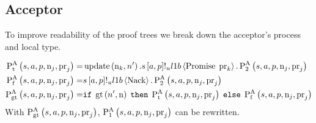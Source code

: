 \subsection{Acceptor}
To improve readability of the proof trees we break down the acceptor's process and local type.

\begin{align*}
\operatorname{P^{A}_{t}}\left(
    s,
    a,
    p,
    \operatorname{n}_{j},
    \operatorname{pr}_{j}
\right) =
& \operatorname{update} \left(\operatorname{n}_{k}, n'\right).s\left[a, p\right]!_u l1b \left\langle \operatorname{Promise}\; \operatorname{pr}_{k} \right\rangle.\operatorname{P^{A}_{2}}\left(
    s,
    a,
    p,
    \operatorname{n}_{j},
    \operatorname{pr}_{j}
\right)
\\
\operatorname{P^{A}_{f}}\left(
    s,
    a,
    p,
    \operatorname{n}_{j},
    \operatorname{pr}_{j}
\right) =
&
    s\left[a, p\right]!_u l1b \left\langle \operatorname{Nack} \right\rangle.
    \operatorname{P^{A}_{2}}\left(
        s,
        a,
        p,
        \operatorname{n}_{j},
        \operatorname{pr}_{j}
    \right)
    \\
\operatorname{P^{A}_{gt}}\left(
    s,
    a,
    p,
    \operatorname{n}_{j},
    \operatorname{pr}_{j}
\right) =
&
    \mathtt{if}\; \operatorname{gt}\left(n', \operatorname{n}\right)
    \;\mathtt{then}\; \operatorname{P^{A}_{t}}\left(
        s,
        a,
        p,
        \operatorname{n}_{j},
        \operatorname{pr}_{j}
    \right)
    \;\mathtt{else}\; \operatorname{P^{A}_{f}}\left(
        s,
        a,
        p,
        \operatorname{n}_{j},
        \operatorname{pr}_{j}
    \right)
\end{align*}
With $\operatorname{P^{A}_{gt}}\left(
    s,
    a,
    p,
    \operatorname{n}_{j},
    \operatorname{pr}_{j}
\right)$, $\operatorname{P^{A}_{1}}\left(
    s,
    a,
    p,
    \operatorname{n}_{j},
    \operatorname{pr}_{j}
\right)$ can be rewritten.

